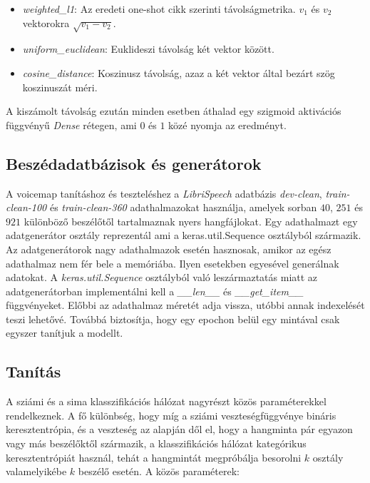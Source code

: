 \begin{itemize}
	\item \emph{weighted\_l1}: Az eredeti one-shot cikk szerinti távolságmetrika. $v_1$ és $v_2$ vektorokra $\sqrt{v_1-v_2}$.
	\item \emph{uniform\_euclidean}: Euklideszi távolság két vektor között.
	\item \emph{cosine\_distance}: Koszinusz távolság, azaz a két vektor által bezárt szög koszinuszát méri.
\end{itemize}

A kiszámolt távolság ezután minden esetben áthalad egy szigmoid aktivációs függvényű \emph{Dense} rétegen, ami $0$ és $1$ közé nyomja az eredményt.

\subsection{Beszédadatbázisok és generátorok}

A voicemap tanításhoz és teszteléshez a \emph{LibriSpeech} adatbázis \emph{dev-clean}, \emph{train-clean-100} és \emph{train-clean-360} adathalmazokat használja, amelyek sorban $40$, $251$ és $921$ különböző beszélőtől tartalmaznak nyers hangfájlokat.
\newline
\newline
Egy adathalmazt egy adatgenerátor osztály reprezentál ami a keras.util.Sequence osztályból származik. Az adatgenerátorok nagy adathalmazok esetén hasznosak, amikor az egész adathalmaz nem fér bele a memóriába. Ilyen esetekben egyesével generálnak adatokat.
\newline
\newline
A \emph{keras.util.Sequence} osztályból való leszármaztatás miatt az adatgenerátorban implementálni kell a \emph{\_\_len\_\_} és \emph{\_\_get\_item\_\_} függvényeket. Előbbi az adathalmaz méretét adja vissza, utóbbi annak indexelését teszi lehetővé. Továbbá biztosítja, hogy egy epochon belül egy mintával csak egyszer tanítjuk a modellt.

\subsection{Tanítás}

A sziámi és a sima klasszifikációs hálózat nagyrészt közös paraméterekkel rendelkeznek. A fő különbség, hogy míg a sziámi veszteségfüggvénye bináris keresztentrópia, és a veszteség az alapján dől el, hogy a hangminta pár egyazon vagy más beszélőktől származik, a klasszifikációs hálózat kategórikus keresztentrópiát használ, tehát a hangmintát megpróbálja besorolni $k$ osztály valamelyikébe $k$ beszélő esetén. A közös paraméterek:

